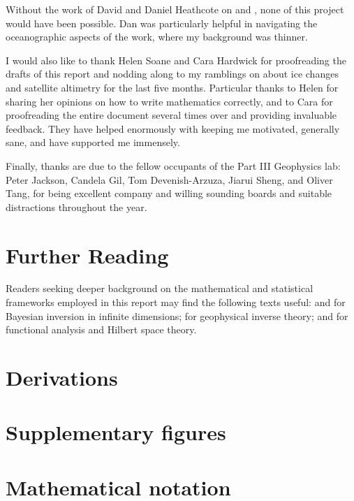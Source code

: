 \documentclass[titlepage, a4paper,12pt, twoside]{article}
\begin{document}
Without the work of David and Daniel Heathcote on  and , none of this project would have been possible. Dan was particularly helpful in navigating the oceanographic aspects of the work, where my background was thinner.

I would also like to thank Helen Soane and Cara Hardwick for proofreading the drafts of this report and nodding along to my ramblings on about ice changes and satellite altimetry for the last five months. Particular thanks to Helen for sharing her opinions on how to write mathematics correctly, and to Cara for proofreading the entire document several times over and providing invaluable feedback. They have helped enormously with keeping me motivated, generally sane, and have supported me immensely.

Finally, thanks are due to the fellow occupants of the Part III Geophysics lab: Peter Jackson, Candela Gil, Tom Devenish-Arzuza, Jiarui Sheng, and Oliver Tang, for being excellent company and willing sounding boards and suitable distractions throughout the year.

{\let\clearpage\relax
{}
\section*{Further Reading}}

Readers seeking deeper background on the mathematical and statistical frameworks employed in this report may find the following texts useful:  \autocite{stuartInverseProblemsBayesian2010} and \textcite{bui-thanhComputationalFrameworkInfiniteDimensional2013} for Bayesian inversion in infinite dimensions;  \autocite{parkerGeophysicalInverseTheory1994} for geophysical inverse theory; and  \autocite{rudinFunctionalAnalysis1991} for functional analysis and Hilbert space theory.

\printbibliography[heading=bibintoc]


\appendix
\renewcommand{\thefigure}{A\arabic{figure}}
\setcounter{figure}{0}

\section{Derivations}


\section{Supplementary figures}


\section{Mathematical notation}



\end{document}
